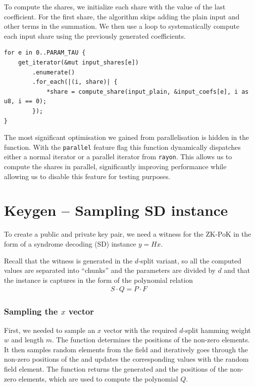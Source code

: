 \documentclass[11pt]{report}
\theoremstyle{definition}
\theoremstyle{plain}
\begin{document}
To compute the shares, we initialize each share with the value of the last coefficient. For the first share, the algorithm skips adding the plain input and other terms in the summation. We then use a loop to systematically compute each input share using the previously generated coefficients.

\begin{verbatim}
for e in 0..PARAM_TAU {
    get_iterator(&mut input_shares[e])
        .enumerate()
        .for_each(|(i, share)| {
            *share = compute_share(input_plain, &input_coefs[e], i as u8, i == 0);
        });
}
\end{verbatim}

The most significant optimisation we gained from parallelisation is hidden in the  function. With the \texttt{parallel} feature flag this function dynamically dispatches either a normal iterator or a parallel iterator from \texttt{rayon}. This allows us to compute the shares in parallel, significantly improving performance while allowing us to disable this feature for testing purposes.

\section{Keygen -- Sampling SD instance}\label{sub:witness_generation}

To create a public and private key pair, we need a witness for the ZK-PoK in the form of a syndrome decoding (SD) instance $y = Hx$.

Recall that the witness is generated in the $d$-split variant, so all the computed values are separated into ``chunks'' and the parameters are divided by $d$ and that the instance is captures in the form of the polynomial relation
\begin{align*}
  S\cdot Q = P\cdot F
\end{align*}

\subsubsection{Sampling the $x$ vector}

First, we needed to sample an $x$ vector with the required $d$-split hamming weight $w$ and length $m$. The function  determines the positions of the non-zero elements. It then samples random elements from the field and iteratively goes through the non-zero positions of the  and updates the corresponding values with the random field element. The function returns the generated  and the positions of the non-zero elements, which are used to compute the polynomial $Q$.
\end{document}
